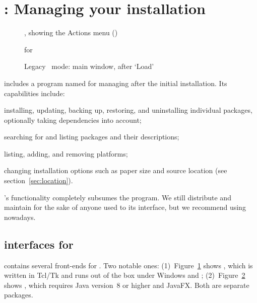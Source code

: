 \documentclass{article}
\begin{document}
\section{: Managing your installation}
\label{sec:tlmgr}

\begin{figure}[tb]
\caption{ \GUI, showing the Actions menu (\MacOSX)}
\label{fig:tlshell}
\end{figure}

\begin{figure}[tb]
\caption{ \GUI{} for }
\label{fig:tlcockpit}
\end{figure}

\begin{figure}[tb]
\caption{Legacy  \GUI\ mode: main window, after `Load'}
\label{fig:tlmgr-gui}
\end{figure}

\TL{} includes a program named  for managing \TL{} after the
initial installation.  Its capabilities include:

\begin{itemize*}
\item installing, updating, backing up, restoring, and uninstalling
  individual packages, optionally taking dependencies into account;
\item searching for and listing packages and their descriptions;
\item listing, adding, and removing platforms;
\item changing installation options such as paper size and source
  location (see section~\ref{sec:location}).
\end{itemize*}

's functionality completely subsumes the 
program.  We still distribute and maintain  for the sake
of anyone used to its interface, but we recommend using 
nowadays.

\subsection{\GUI{} interfaces for }

\TL{} contains several \GUI{} front-ends for . Two notable
ones: (1)~Figure~\ref{fig:tlshell} shows , which is
written in Tcl/Tk and runs out of the box under Windows and \MacOSX;
(2)~Figure~\ref{fig:tlcockpit} shows , which requires
Java version~8 or higher and JavaFX. Both are separate packages.
\end{document}
